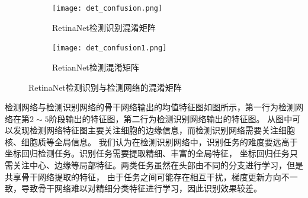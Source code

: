 \begin{table}[htbp]   
  \caption{RetinaNet网络各类别的准确率与召回率}      
  \centering    
  \label{table:cell_cls}
  \centering  
\end{table}

\begin{figure}[htbp]                  
  \centering                   
	\begin{subfigure}{0.48\linewidth}
		\centering
    \texttt{[image: det\_confusion.png]}                   
    \caption{RetinaNet检测识别混淆矩阵}
	\end{subfigure}
	\begin{subfigure}{0.48\linewidth}
		\centering
		\texttt{[image: det\_confusion1.png]}
    \caption{RetianNet检测混淆矩阵}
	\end{subfigure}
  \caption{RetinaNet检测识别与检测网络的混淆矩阵}                   
  \label{fig:det_confusion}      
\end{figure}   

检测网络与检测识别网络的骨干网络输出的均值特征图如图所示，第一行为检测网络在第$2\sim 5$阶段输出的特征图，第二行为检测识别网络输出的特征图。
从图中可以发现检测网络特征图主要关注细胞的边缘信息，而检测识别网络需要关注细胞核、细胞质等全局信息。
我们认为在检测识别网络中，识别任务的难度要远高于坐标回归检测任务。识别任务需要提取精细、丰富的全局特征，
坐标回归任务只需关注中心、边缘等局部特征。两类任务虽然在头部由不同的分支进行学习，但是共享骨干网络提取的特征，
由于任务之间可能存在相互干扰，梯度更新方向不一致，导致骨干网络难以对精细分类特征进行学习，因此识别效果较差。

